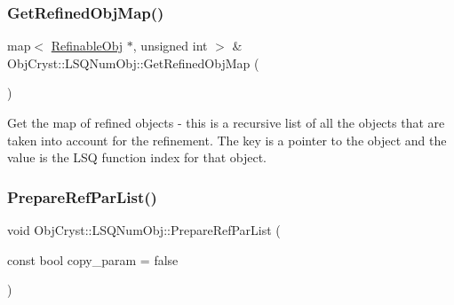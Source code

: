 \subsubsection{\texorpdfstring{GetRefinedObjMap()}{GetRefinedObjMap()}\hspace{0.1cm}{\footnotesize\ttfamily [2/2]}}
{\footnotesize\ttfamily map$<$ \mbox{\hyperlink{class_obj_cryst_1_1_refinable_obj}{Refinable\+Obj}} $\ast$, unsigned int $>$ \& Obj\+Cryst\+::\+L\+S\+Q\+Num\+Obj\+::\+Get\+Refined\+Obj\+Map (\begin{DoxyParamCaption}{ }\end{DoxyParamCaption})}

Get the map of refined objects -\/ this is a recursive list of all the objects that are taken into account for the refinement. The key is a pointer to the object and the value is the L\+SQ function index for that object. \mbox{\label{class_obj_cryst_1_1_l_s_q_num_obj_afdeb58450a3e0506fc02a0b5df15a600}} 
\subsubsection{\texorpdfstring{PrepareRefParList()}{PrepareRefParList()}}
{\footnotesize\ttfamily void Obj\+Cryst\+::\+L\+S\+Q\+Num\+Obj\+::\+Prepare\+Ref\+Par\+List (\begin{DoxyParamCaption}\item[{const bool}]{copy\+\_\+param = {\ttfamily false} }\end{DoxyParamCaption})}


